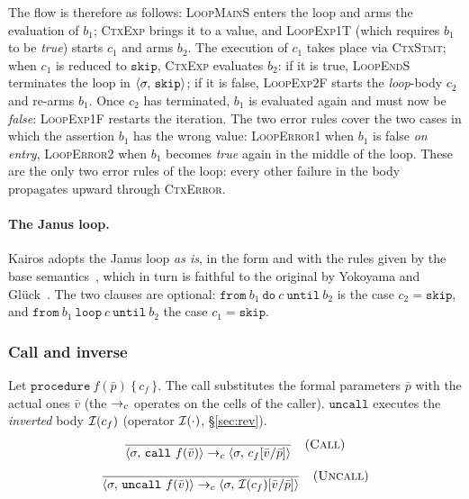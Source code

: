 \noindent
The flow is therefore as follows: \textsc{LoopMainS} enters the loop and arms the evaluation
of $b_1$; \textsc{CtxExp} brings it to a value, and \textsc{LoopExp1T} (which
requires $b_1$ to be \emph{true}) starts $c_1$ and arms $b_2$. The execution of $c_1$
takes place via \textsc{CtxStmt}; when $c_1$ is reduced to $\mathtt{skip}$,
\textsc{CtxExp} evaluates $b_2$: if it is true, \textsc{LoopEndS} terminates the loop in
$\langle \sigma,\, \mathtt{skip} \rangle$; if it is false, \textsc{LoopExp2F} starts the
\emph{loop}-body $c_2$ and re-arms $b_1$. Once $c_2$ has terminated, $b_1$ is
evaluated again and must now be \emph{false}: \textsc{LoopExp1F} restarts
the iteration. The two error rules cover the two cases in which the assertion
$b_1$ has the wrong value: \textcolor{red!60!black}{\textsc{LoopError1}}
when $b_1$ is false \emph{on entry}, \textcolor{red!60!black}{\textsc{LoopError2}}
when $b_1$ becomes \emph{true} again in the middle of the loop. These are the only two error rules
of the loop: every other failure in the body propagates upward through
\textcolor{red!60!black}{\textsc{CtxError}}.

\paragraph{The Janus loop.} Kairos adopts the Janus loop \emph{as is},
in the form and with the rules given by the base semantics~\cite{LamiLaneseStefani2024},
which in turn is faithful to the original by Yokoyama and Glück~\cite{YokoyamaGluck2007}.
The two clauses are optional: $\mathtt{from}\ b_1\ \mathtt{do}\ c\
\mathtt{until}\ b_2$ is the case $c_2 = \mathtt{skip}$, and
$\mathtt{from}\ b_1\ \mathtt{loop}\ c\ \mathtt{until}\ b_2$ the case
$c_1 = \mathtt{skip}$.

\subsubsection{Call and inverse}
\label{sec:call}
Let $\mathtt{procedure}\ f(\bar p)\ \{\, c_f \,\}$. The call substitutes the
formal parameters $\bar p$ with the actual ones $\bar v$ (the $\to_c$ operates on the cells
of the caller). $\mathtt{uncall}$ executes the \emph{inverted} body
$\mathcal{I}(c_f)$ (operator $\mathcal{I}(\cdot)$, \S\ref{sec:rev}).
\[
\dfrac{}{\langle \sigma,\, \mathtt{call}\ f(\bar v) \rangle \to_c \langle \sigma,\, c_f[\bar v/\bar p] \rangle} \quad(\textsc{Call})
\]
\[
\dfrac{}{\langle \sigma,\, \mathtt{uncall}\ f(\bar v) \rangle \to_c \langle \sigma,\, \mathcal{I}(c_f)[\bar v/\bar p] \rangle} \quad(\textsc{Uncall})
\]

